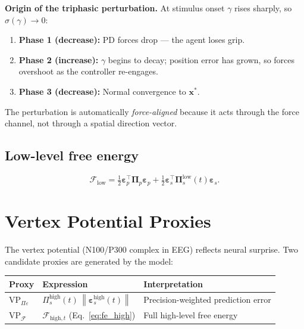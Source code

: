\documentclass[11pt, a4paper]{article}
\newcommand{\vect}[1]{\bm{#1}}
\newcommand{\mat}[1]{\mathbf{#1}}
\newcommand{\FE}{\mathcal{F}}
\newcommand{\norm}[1]{\left\|#1\right\|}
\newcommand{\Pip}{\mat{\Pi}_p}
\newcommand{\Pisl}{\mat{\Pi}_s^{\text{low}}}
\newcommand{\Pish}{\Pi_s^{\text{high}}}
\newcommand{\epsp}{\vect{\varepsilon}_p}
\newcommand{\epss}{\vect{\varepsilon}_s}
\begin{document}
\begin{keybox}
\textbf{Origin of the triphasic perturbation.}
At stimulus onset $\gamma$ rises sharply, so $\sigma(\gamma) \to 0$:
\begin{enumerate}[noitemsep]
  \item \textbf{Phase 1 (decrease):} PD forces drop — the agent loses grip.
  \item \textbf{Phase 2 (increase):} $\gamma$ begins to decay; position error
        has grown, so forces overshoot as the controller re-engages.
  \item \textbf{Phase 3 (decrease):} Normal convergence to $\vect{x}^*$.
\end{enumerate}
The perturbation is automatically \emph{force-aligned} because it acts through
the force channel, not through a spatial direction vector.
\end{keybox}

\subsection{Low-level free energy}
\begin{equation}
  \FE_{\text{low}} = \tfrac{1}{2}\epsp^\top\Pip\epsp
                   + \tfrac{1}{2}\epss^\top\Pisl(t)\epss.
\end{equation}

\section{Vertex Potential Proxies}
\label{sec:vp}

The vertex potential (N100/P300 complex in EEG) reflects neural surprise.
Two candidate proxies are generated by the model:

\begin{center}
\renewcommand{\arraystretch}{1.5}
\begin{tabular}{lll}
\toprule
\textbf{Proxy} & \textbf{Expression} & \textbf{Interpretation} \\
\midrule
$\text{VP}_{\Pi\varepsilon}$ &
  $\Pish(t)\,\norm{\vect{\varepsilon}_s^{\text{high}}(t)}$ &
  Precision-weighted prediction error \\
$\text{VP}_{\FE}$ &
  $\FE_{\text{high},t}$ (Eq.~\ref{eq:fe_high}) &
  Full high-level free energy \\
\bottomrule
\end{tabular}
\end{center}
\end{document}
